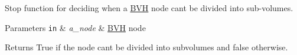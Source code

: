 Stop function for deciding when a \hyperlink{namespaceBVH}{B\+VH} node can\textquotesingle{}t be divided into sub-\/volumes. 


\begin{DoxyParams}[1]{Parameters}
\mbox{\tt in}  & {\em a\+\_\+node} & \hyperlink{namespaceBVH}{B\+VH} node \\
\hline
\end{DoxyParams}
\begin{DoxyReturn}{Returns}
True if the node can\textquotesingle{}t be divided into subvolumes and false otherwise. 
\end{DoxyReturn}

